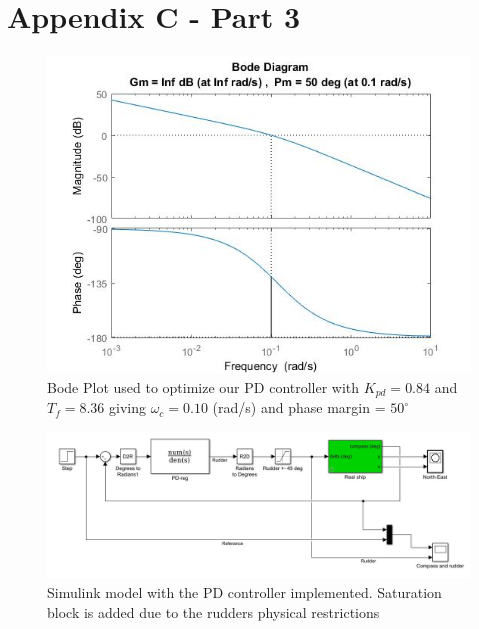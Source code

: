 \section{Appendix C - Part 3}

\begin{figure}[H]
    \centering
    \includegraphics[width=1\textwidth]{Plots/3a_bode_plot.jpg}
    \caption{Bode Plot used to optimize our PD controller with $K_{pd} = 0.84$ and $T_f = 8.36$ giving $\omega_c = 0.10$ (rad/s) and phase margin = $50^{\circ}$}
    \label{fig: 3a_bode_plot}
\end{figure}

\begin{figure}[H]
    \centering
    \includegraphics[width=1\textwidth]{Plots/3bcd_simulink_model.jpg}
    \caption{Simulink model with the PD controller implemented. Saturation block is added due to the rudders physical restrictions}
    \label{fig: 3bcd_simulink}
\end{figure}


